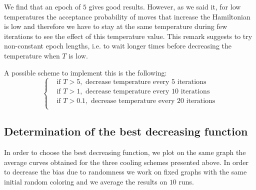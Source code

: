 \documentclass[a4paper]{article}
\begin{document}
We find that an epoch of $5$ gives good results. However, as we said it, for low temperatures the acceptance probability of moves that increase the Hamiltonian is low and therefore we have to stay at the same temperature during few iterations to see the effect of this temperature value. This remark suggests to try non-constant epoch lengths, i.e. to wait longer times before decreasing the temperature when $T$ is low.

A possible scheme to implement this is the following:
\begin{equation*}
\left\{
\begin{aligned}
&\textrm{if }T>5, \textrm{ decrease temperature every 5 iterations}\\
&\textrm{if }T>1, \textrm{ decrease temperature every 10 iterations}\\
&\textrm{if }T>0.1, \textrm{ decrease temperature every 20 iterations}\\
\end{aligned}
\right.
\end{equation*}

\subsection{Determination of the best decreasing function}

In order to choose the best decreasing function, we plot on the same graph the average curves obtained for the three cooling schemes presented above. In order to decrease the bias due to randomness we work on fixed graphs with the same initial random coloring and we average the results on $10$ runs.
\end{document}
